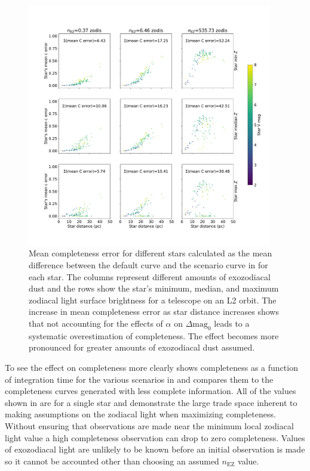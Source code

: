 \begin{figure}
  \begin{center}
    \includegraphics[width=0.95\textwidth]{ch3/figures/mean_comp_errors.pdf}
  \end{center}
  \caption{Mean completeness error for different stars calculated as the mean difference between
  the default curve and the scenario curve in  for each star. The columns represent
  different amounts of exozodiacal dust and the rows show the star's minimum, median, and maximum zodiacal
  light surface brightness for a telescope on an L2 orbit. The increase in 
  mean completeness error as star distance increases shows that not accounting for the effects of
  $\alpha$ on $\Delta\textrm{mag}_0$ leads to a systematic overestimation of completeness. 
  The effect becomes more pronounced for greater amounts of exozodiacal dust 
  assumed.}
  \label{fig:mean_comp_errors}
\end{figure}

To see the effect on completeness more clearly  shows
completeness as a function of integration time for the various scenarios in
 and compares them to the completeness curves generated
with less complete information. All of the values shown in
 are for a
single star and demonstrate the large trade space inherent to making
assumptions on the zodiacal light when maximizing completeness. Without
ensuring that observations are made near the minimum local zodiacal light value
a high completeness observation can drop to zero completeness. Values of
exozodiacal light are unlikely to be known before an initial observation is
made so it cannot be accounted other than choosing an assumed $n_\textrm{EZ}$
value.

